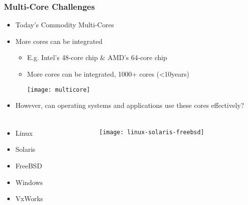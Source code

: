 \begin{frame}[plain]	
	\frametitle{Multi-Core Challenges}
	
	\begin{itemize}\Large
		\item Today's Commodity Multi-Cores
		\item More cores can be integrated
		\begin{itemize}\Large
			\item E.g. Intel's 48-core chip \& AMD's 64-core chip
			\item More cores can be integrated, 1000+ cores (<10years)

	\centering
	\texttt{[image: multicore]}
			
		\end{itemize}\pause
	\item However, can operating systems and applications use
	these cores effectively?
	\end{itemize}

	
\end{frame}


\begin{frame}[plain]
	\frametitle{ }
	\begin{columns}
		\begin{column}{.5\textwidth}
			
		\begin{itemize}\LARGE
			\item Linux
			\item Solaris
			\item FreeBSD
			\item Windows
			\item VxWorks
			
		\end{itemize}
			
		\end{column}
		
		\begin{column}{.5\textwidth}
			
			\texttt{[image: linux-solaris-freebsd]}
			
		\end{column}
	\end{columns}
\end{frame}

